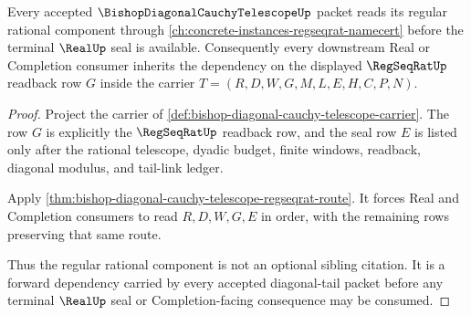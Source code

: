 \begin{theorem}
\label{thm:bishop-diagonal-cauchy-telescope-regular-readback-forward-link}
Every accepted $\BishopDiagonalCauchyTelescopeUp$ packet reads its regular rational component through \autoref{ch:concrete-instances-regseqrat-namecert} before the terminal $\RealUp$ seal is available. Consequently every downstream Real or Completion consumer inherits the dependency on the displayed $\RegSeqRatUp$ readback row $G$ inside the carrier $T=(R,D,W,G,M,L,E,H,C,P,N)$.
\end{theorem}
\begin{proof}
Project the carrier of \autoref{def:bishop-diagonal-cauchy-telescope-carrier}. The row $G$ is explicitly the $\RegSeqRatUp$ readback row, and the seal row $E$ is listed only after the rational telescope, dyadic budget, finite windows, readback, diagonal modulus, and tail-link ledger.

Apply \autoref{thm:bishop-diagonal-cauchy-telescope-regseqrat-route}. It forces Real and Completion consumers to read $R,D,W,G,E$ in order, with the remaining rows preserving that same route.

Thus the regular rational component is not an optional sibling citation. It is a forward dependency carried by every accepted diagonal-tail packet before any terminal $\RealUp$ seal or Completion-facing consequence may be consumed.
\end{proof}

